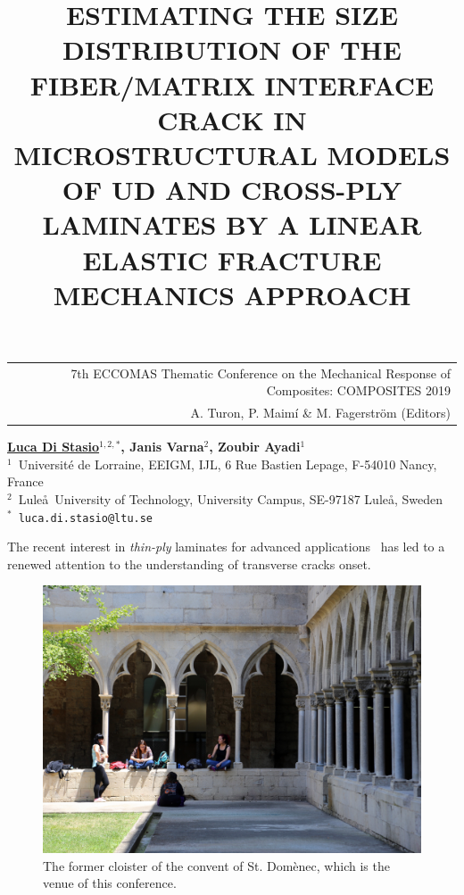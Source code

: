 \documentclass[12pt,a4paper]{article}
\begin{document}
\thispagestyle{empty}

\vspace*{-3.4cm}
\begin{table}[!h]
\begin{tabular}{r}
\hspace*{2.9cm} \scriptsize \textsf{7th ECCOMAS Thematic Conference on the Mechanical Response of Composites: COMPOSITES 2019} \\
\hspace*{2.9cm} \tiny \textsf{A. Turon, P. Maimí \& M. Fagerström (Editors)}
\end{tabular}
\end{table}

\vspace*{-0.7cm}

\begin{center}
\title{ESTIMATING THE SIZE DISTRIBUTION OF THE FIBER/MATRIX INTERFACE CRACK IN MICROSTRUCTURAL MODELS OF UD AND CROSS-PLY LAMINATES BY A LINEAR ELASTIC FRACTURE MECHANICS APPROACH}
\end{center}
\begin{center}
\textbf{\underline{Luca Di Stasio}$^{1,2,*}$, Janis Varna$^{2}$, Zoubir Ayadi$^{1}$} \\ [7pt]
\small{$^1$~Universit\'e de Lorraine, EEIGM, IJL, 6 Rue Bastien Lepage, F-54010 Nancy, France}  \\  [2pt]
\small{$^2$~Lule\aa\ University of Technology, University Campus, SE-97187 Lule\aa, Sweden}  \\  [2pt]
\small{$^*$~\texttt{luca.di.stasio@ltu.se}} \\
\end{center}

\noindent
The recent interest in \emph{thin-ply} laminates for advanced applications~\cite{Kopp2017} has led to a renewed attention to the understanding of transverse cracks onset.

\begin{figure}[h]
\centering\includegraphics[width=0.55\linewidth]{Claustre.pdf}
\caption{The former cloister of the convent of St. Domènec, which is the venue of this conference.}
\label{fig:Claustre}
\end{figure}
\end{document}
